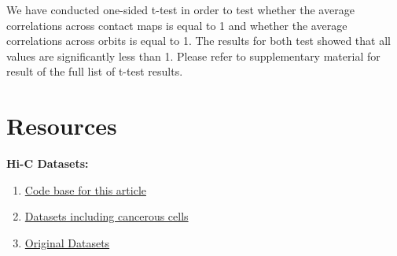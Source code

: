 \documentclass[a4,center,fleqn]{NAR}
\begin{document}
We have conducted one-sided
t-test in order to test whether the average correlations across
contact maps is equal to 1  and whether the average 
correlations across orbits is equal to 1. The results
for both test showed that all values are significantly less than 1.
Please refer to supplementary material for result of the 
full list of t-test results.
\newpage
\section{Resources}
\textbf{Hi-C Datasets:}
\begin{enumerate}
    \item \href{https://github.com/rasoolianbehnam/watson}{Code base for this article}
    \item \href{http://sysbio.rnet.missouri.edu/T0510/tmp_download/link_to_download_genome_data/}
        {Datasets including cancerous cells}
    \item \href{https://bcm.app.box.com/v/aidenlab/folder/11234760671}{Original Datasets}
\end{enumerate}





\end{document}
